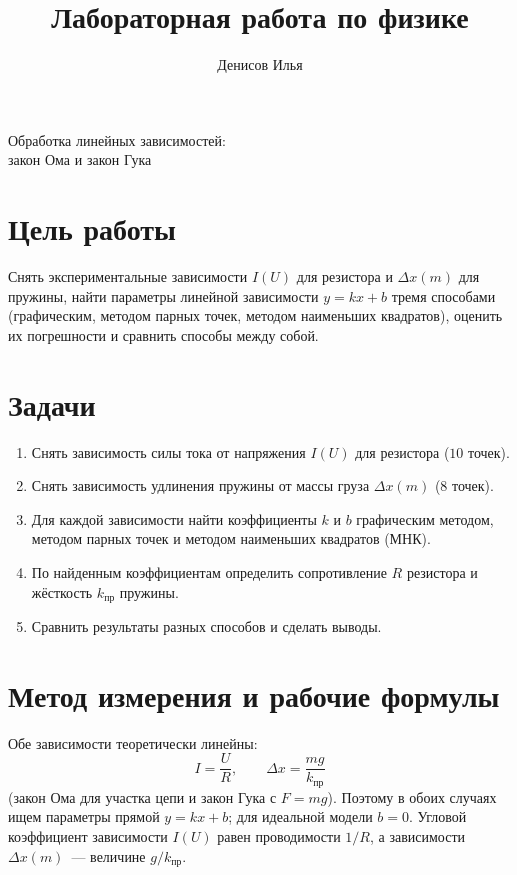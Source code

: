 \documentclass[12pt]{article}
\title{Лабораторная работа по физике}
\author{Денисов Илья}
\date{}
\begin{document}
    \maketitle

    \vspace{5cm}
    {\centering \LARGE Обработка линейных зависимостей: \\ закон Ома и закон Гука \par}

    \newpage

    \tableofcontents
	\setcounter{tocdepth}{3}

	\newpage

    \section{Цель работы}

    Снять экспериментальные зависимости $I(U)$ для резистора и $\varDelta x(m)$ для пружины, найти параметры линейной зависимости $y = kx + b$ тремя способами (графическим, методом парных точек, методом наименьших квадратов), оценить их погрешности и сравнить способы между собой.

    \section{Задачи}

    \begin{enumerate}
        \item Снять зависимость силы тока от напряжения $I(U)$ для резистора ($10$ точек).
        \item Снять зависимость удлинения пружины от массы груза $\varDelta x(m)$ ($8$ точек).
        \item Для каждой зависимости найти коэффициенты $k$ и $b$ графическим методом, методом парных точек и методом наименьших квадратов (МНК).
        \item По найденным коэффициентам определить сопротивление $R$ резистора и жёсткость $k_{\text{пр}}$ пружины.
        \item Сравнить результаты разных способов и сделать выводы.
    \end{enumerate}

    \section{Метод измерения и рабочие формулы}

    Обе зависимости теоретически линейны:
    \[
    	I = \frac{U}{R}, \qquad \varDelta x = \frac{mg}{k_{\text{пр}}}
    \]
    (закон Ома для участка цепи и закон Гука с $F = mg$). Поэтому в обоих случаях ищем параметры прямой $y = kx + b$; для идеальной модели $b = 0$. Угловой коэффициент зависимости $I(U)$ равен проводимости $1/R$, а зависимости $\varDelta x(m)$~--- величине $g/k_{\text{пр}}$.
\end{document}
